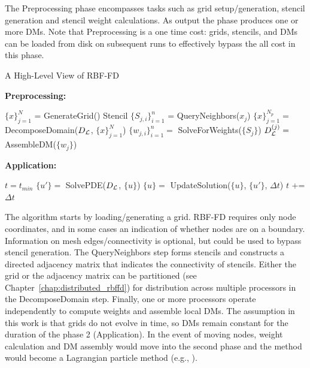 \documentclass[11pt]{report}
\begin{document}
{The Preprocessing phase encompasses tasks such as grid setup/generation, stencil generation and stencil weight calculations. As output the phase produces one or more DMs. Note that Preprocessing is a one time cost: grids, stencils, and DMs can be loaded from disk on subsequent runs to effectively bypass the all cost in this phase. 

\begin{algorithm}                      
\caption{A High-Level View of RBF-FD}          
\label{alg:rbffd_high_level}                           
\textbf{Preprocessing:}
\begin{algorithmic}[0]                   
    \State $\{x\}_{j=1}^N$ = GenerateGrid()
   	 \label{alg:stencil_gen} 
   	    \State Stencil $\{S_{j,i}\}_{i=1}^{n}$ = QueryNeighbors($x_j$)
   	\EndFor
    \State $\{x\}_{j=1}^{N_p} = $ DecomposeDomain($D_{\mathcal{L}}$, $\{x\}_{j=1}^N$)
     \label{alg:weight_calc} 
   	    \State $\{w_{j,i}\}_{i=1}^{n} = $ SolveForWeights($\{S_j\}$)
   	    \State $D_{\mathcal{L}}^{(j)} = $ AssembleDM($\{w_j\}$)     
    \EndFor
\end{algorithmic}
\textbf{Application:}
\begin{algorithmic}[1] 
    \State $t = t_{min}$                
        \State $\{u'\} =$ SolvePDE($D_{\mathcal{L}}$, $\{u\}$)
        \State $\{u\} =$ UpdateSolution($\{u\}$, $\{u'\}$, $\Delta t$)
        \State $t$ += $\Delta t$
    \EndWhile
\end{algorithmic}
\end{algorithm}

The algorithm starts by loading/generating a grid. RBF-FD requires only node coordinates, and in some cases an indication of whether nodes are on a boundary. Information on mesh edges/connectivity is optional, but could be used to bypass stencil generation. The QueryNeighbors step forms stencils and constructs a directed adjacency matrix that indicates the connectivity of stencils. Either the grid or the adjacency matrix can be partitioned (see Chapter~\ref{chap:distributed_rbffd}) for distribution across multiple processors in the DecomposeDomain step. Finally, one or more processors operate independently to compute weights and assemble local DMs. The assumption in this work is that grids do not evolve in time, so DMs remain constant for the duration of the phase 2 (Application). In the event of moving nodes, weight calculation and DM assembly would move into the second phase and the method would become a Lagrangian particle method (e.g., \cite{SpH}). 



}
\end{document}
